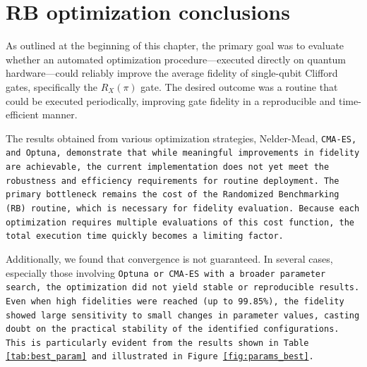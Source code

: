 \section{RB optimization conclusions}

As outlined at the beginning of this chapter, the primary goal was to evaluate whether an automated optimization procedure—executed directly on quantum hardware—could reliably improve the average fidelity of single-qubit Clifford gates, specifically the $R_X(\pi)$ gate. 
The desired outcome was a routine that could be executed periodically, improving gate fidelity in a reproducible and time-efficient manner.

The results obtained from various optimization strategies, Nelder-Mead, \tt{CMA-ES}, and \tt{Optuna}, demonstrate that while meaningful improvements in fidelity are achievable, the current implementation does not yet meet the robustness and efficiency requirements for routine deployment. 
The primary bottleneck remains the cost of the Randomized Benchmarking (RB) routine, which is necessary for fidelity evaluation. 
Because each optimization requires multiple evaluations of this cost function, the total execution time quickly becomes a limiting factor.

Additionally, we found that convergence is not guaranteed. 
In several cases, especially those involving \tt{Optuna} or \tt{CMA-ES} with a broader parameter search, the optimization did not yield stable or reproducible results.
Even when high fidelities were reached (up to 99.85\%), the fidelity showed large sensitivity to small changes in parameter values, casting doubt on the practical stability of the identified configurations.
This is particularly evident from the results shown in Table \ref{tab:best_param} and illustrated in Figure \ref{fig:params_best}.

